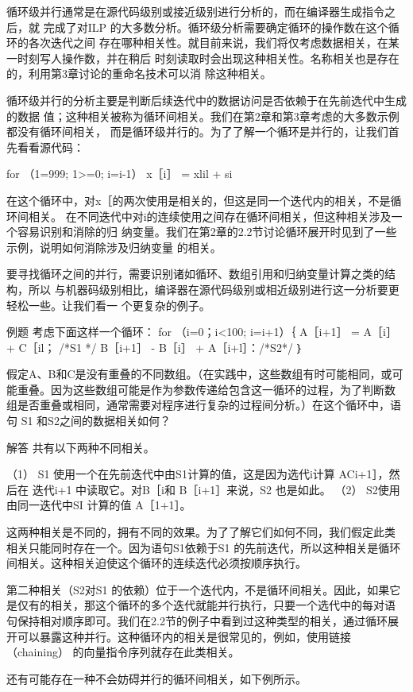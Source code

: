 循环级并行通常是在源代码级别或接近级别进行分析的，而在编译器生成指令之后，就
完成了对ILP 的大多数分析。循环级分析需要确定循环的操作数在这个循环的各次迭代之间
存在哪种相关性。就目前来说，我们将仅考虑数据相关，在某一时刻写人操作数，并在稍后
时刻读取时会出现这种相关性。名称相关也是存在的，利用第3章讨论的重命名技术可以消
除这种相关。

循环级并行的分析主要是判断后续迭代中的数据访问是否依赖于在先前选代中生成的数据
值；这种相关被称为循环间相关。我们在第2章和第3章考虑的大多数示例都没有循环间相关，
而是循环级并行的。为了了解一个循环是并行的，让我们首先看看源代码：

for （1=999; 1>=0; i=i-1）
x［i］ = xlil + si

在这个循环中，对x［的两次使用是相关的，但这是同一个迭代内的相关，不是循环间相关。
在不同迭代中对i的连续使用之间存在循环间相关，但这种相关涉及一个容易识别和消除的归
纳变量。我们在第2章的2.2节讨论循环展开时见到了一些示例，说明如何消除涉及归纳变量
的相关。

要寻找循环之间的并行，需要识别诸如循环、数组引用和归纳变量计算之类的结构，所以
与机器码级别相比，编译器在源代码级别或相近级别进行这一分析要更轻松一些。让我们看一
个更复杂的例子。

例题
考虑下面这样一个循环：
for （i=0；i<100; i=i+1）｛
A［i+1］ = A［i］
+ C［il；
/*S1 */
B［i+1］ - B［i］ + A［i+l］：/*S2*/
｝

假定A、B和C是没有重叠的不同数组。（在实践中，这些数组有时可能相同，或可
能重叠。因为这些数组可能是作为参数传递给包含这一循环的过程，为了判断数
组是否重叠或相同，通常需要对程序进行复杂的过程间分析。）在这个循环中，语
句 S1 和S2之间的数据相关如何？

解答
共有以下两种不同相关。

（1） S1 使用一个在先前迭代中由S1计算的值，这是因为选代i计算 ACi+1］，然后在
迭代i+1 中读取它。对B［i和 B［i+1］来说，S2 也是如此。
（2） S2使用由同一迭代中SI 计算的值 A［1+1］。

这两种相关是不同的，拥有不同的效果。为了了解它们如何不同，我们假定此类
相关只能同时存在一个。因为语句S1依赖于S1 的先前迭代，所以这种相关是循环
间相关。这种相关迫使这个循环的连续迭代必须按顺序执行。

第二种相关（S2对S1 的依赖）位于一个迭代内，不是循环间相关。因此，如果它
是仅有的相关，那这个循环的多个迭代就能并行执行，只要一个选代中的每对语
句保持相对顺序即可。我们在2.2节的例子中看到过这种类型的相关，通过循环展
开可以暴露这种并行。这种循环内的相关是很常见的，例如，使用链接（chaining）
的向量指令序列就存在此类相关。

还有可能存在一种不会妨碍并行的循环间相关，如下例所示。


